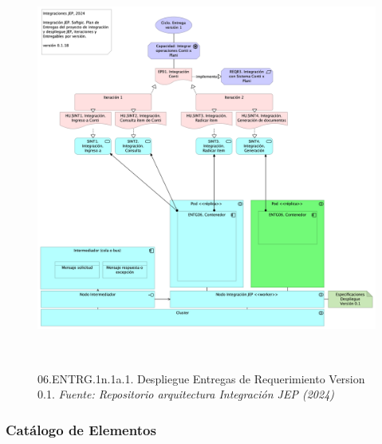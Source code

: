 \documentclass[
  paper=a4,
  ,captions=tableheading
]{scrartcl}
\begin{document}
\begin{figure}
\centering
\includegraphics[width=\textwidth,height=5.20833in]{images/06.ENTRG.1n.1a.1.DespliegueEntregasdeRequerimientoVersion0.1.png}
\caption{06.ENTRG.1n.1a.1. Despliegue Entregas de Requerimiento Version
0.1. \emph{Fuente: Repositorio arquitectura Integración JEP
(2024)}}\label{fig:id-203e737545e449e59334b47d3034d956}
\end{figure}

\subsubsection{Catálogo de
Elementos}\label{sec:catuxe1logo-de-elementos-2}
\end{document}
